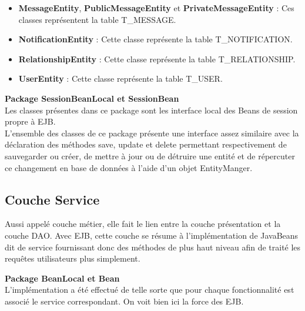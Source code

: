 \documentclass[12pt,a4paper,titlepage]{article}
\begin{document}
\begin{itemize}
\item \textbf{MessageEntity}, \textbf{PublicMessageEntity} et \textbf{PrivateMessageEntity} : Ces classes représentent la table \og{}T\_MESSAGE\fg{}.
\item \textbf{NotificationEntity} : Cette classe représente la table \og{}T\_NOTIFICATION\fg{}.
\item \textbf{RelationshipEntity} : Cette classe représente la table \og{}T\_RELATIONSHIP\fg{}.
\item \textbf{UserEntity} : Cette classe représente la table \og{}T\_USER\fg{}.\\
\end{itemize}

\textbf{Package SessionBeanLocal et SessionBean}\\
Les classes présentes dans ce package sont les interface local des Beans de session 
propre à EJB.\\
\newline
L'ensemble des classes de ce package présente une interface assez similaire avec 
la déclaration des méthodes \og{}save\fg{}, \og{}update\fg{} et \og{}delete\fg{} 
permettant respectivement de sauvegarder ou créer, de mettre à jour ou de détruire 
une entité et de répercuter ce changement en base de données à l'aide d'un objet 
\og{}EntityManger\fg{}.\\
\newline






\clearpage{\pagestyle{empty}}



\subsection{Couche Service}
Aussi appelé \og{}couche métier\fg{}, elle fait le lien entre la couche présentation et la couche DAO.
Avec EJB, cette couche se résume à l'implémentation de JavaBeans dit de service fournissant donc des 
méthodes de plus haut niveau afin de traité les requêtes utilisateurs plus simplement.
\newline

\textbf{Package BeanLocal et Bean}\\
L'implémentation a été effectué de telle sorte que pour chaque fonctionnalité est associé 
le service correspondant. On voit bien ici la force des EJB.
\newline
\end{document}
